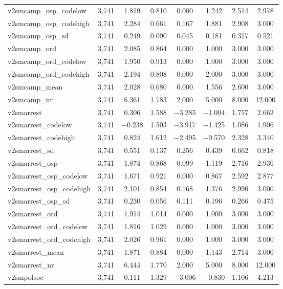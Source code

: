 \begin{table}[!htbp]
\begin{tabular}{@{\extracolsep{5pt}}lccccccc}
v2smcamp\_osp\_codelow & 3,741 & 1.819 & 0.810 & 0.000 & 1.242 & 2.514 & 2.978 \\ 
v2smcamp\_osp\_codehigh & 3,741 & 2.284 & 0.661 & 0.167 & 1.881 & 2.908 & 3.000 \\ 
v2smcamp\_osp\_sd & 3,741 & 0.249 & 0.090 & 0.045 & 0.181 & 0.317 & 0.521 \\ 
v2smcamp\_ord & 3,741 & 2.085 & 0.864 & 0.000 & 1.000 & 3.000 & 3.000 \\ 
v2smcamp\_ord\_codelow & 3,741 & 1.950 & 0.913 & 0.000 & 1.000 & 3.000 & 3.000 \\ 
v2smcamp\_ord\_codehigh & 3,741 & 2.194 & 0.808 & 0.000 & 2.000 & 3.000 & 3.000 \\ 
v2smcamp\_mean & 3,741 & 2.028 & 0.680 & 0.000 & 1.556 & 2.600 & 3.000 \\ 
v2smcamp\_nr & 3,741 & 6.361 & 1.783 & 2.000 & 5.000 & 8.000 & 12.000 \\ 
v2smarrest & 3,741 & 0.306 & 1.588 & $-$3.285 & $-$1.004 & 1.757 & 2.662 \\ 
v2smarrest\_codelow & 3,741 & $-$0.238 & 1.503 & $-$3.917 & $-$1.425 & 1.086 & 1.906 \\ 
v2smarrest\_codehigh & 3,741 & 0.824 & 1.612 & $-$2.495 & $-$0.570 & 2.328 & 3.340 \\ 
v2smarrest\_sd & 3,741 & 0.551 & 0.137 & 0.256 & 0.439 & 0.662 & 0.818 \\ 
v2smarrest\_osp & 3,741 & 1.874 & 0.868 & 0.099 & 1.119 & 2.716 & 2.936 \\ 
v2smarrest\_osp\_codelow & 3,741 & 1.671 & 0.921 & 0.000 & 0.867 & 2.592 & 2.877 \\ 
v2smarrest\_osp\_codehigh & 3,741 & 2.101 & 0.854 & 0.168 & 1.376 & 2.990 & 3.000 \\ 
v2smarrest\_osp\_sd & 3,741 & 0.230 & 0.056 & 0.111 & 0.196 & 0.266 & 0.475 \\ 
v2smarrest\_ord & 3,741 & 1.914 & 1.014 & 0.000 & 1.000 & 3.000 & 3.000 \\ 
v2smarrest\_ord\_codelow & 3,741 & 1.816 & 1.029 & 0.000 & 1.000 & 3.000 & 3.000 \\ 
v2smarrest\_ord\_codehigh & 3,741 & 2.026 & 0.961 & 0.000 & 1.000 & 3.000 & 3.000 \\ 
v2smarrest\_mean & 3,741 & 1.871 & 0.884 & 0.000 & 1.143 & 2.714 & 3.000 \\ 
v2smarrest\_nr & 3,741 & 6.444 & 1.770 & 2.000 & 5.000 & 8.000 & 12.000 \\ 
v2smpolsoc & 3,741 & 0.111 & 1.329 & $-$3.006 & $-$0.830 & 1.106 & 4.213 \\ 

\end{tabular}
\end{table}
